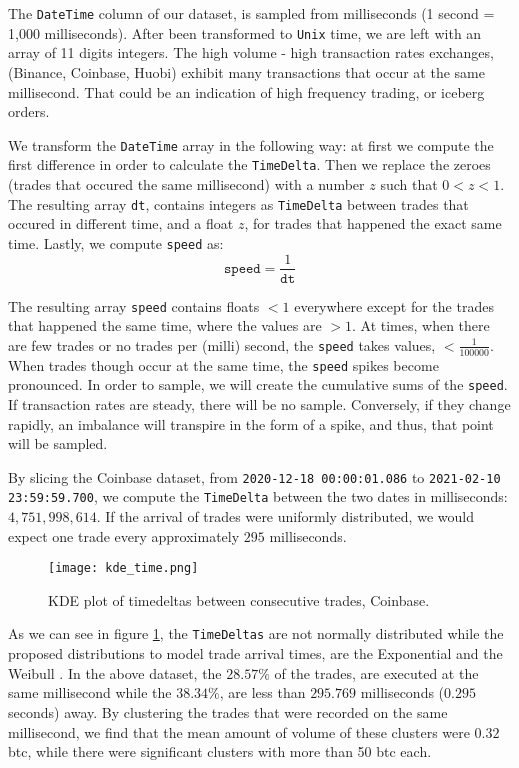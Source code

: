 The \texttt{DateTime} column of our dataset, is sampled from milliseconds (1 second = 1,000 milliseconds). After been transformed to \texttt{Unix} time, we are left with an array of 11 digits integers. The high volume - high transaction rates exchanges, (Binance, Coinbase, Huobi) exhibit many transactions that occur at the same millisecond. That could be an indication of high frequency trading, or iceberg orders. 

We transform the \texttt{DateTime} array in the following way: at first we compute the first difference in order to calculate the \texttt{TimeDelta}. Then we replace the zeroes (trades that occured the same millisecond) with a number \(z\) such that \( 0 < z < 1 \). The resulting array \texttt{dt}, contains integers as \texttt{TimeDelta} between trades that occured in different time, and a float \(z\), for trades that happened the exact same time. Lastly, we compute \texttt{speed} as:
\[ \texttt{speed} = \frac{1}{\texttt{dt}} \] 

The resulting array \texttt{speed} contains floats \( < 1 \) everywhere except for the trades that happened the same time, where the values are \( > 1 \). At times, when there are few trades or no trades per (milli) second, the \texttt{speed} takes values, \( < \frac{1}{100000} \). When trades though occur at the same time, the \texttt{speed} spikes become pronounced. In order to sample, we will create the cumulative sums of the \texttt{speed}. If transaction rates are steady, there will be no sample. Conversely, if they change rapidly, an imbalance will transpire in the form of a spike, and thus, that point will be sampled.

By slicing the Coinbase dataset, from \texttt{2020-12-18 00:00:01.086} to \texttt{2021-02-10 23:59:59.700}, we compute the \texttt{TimeDelta} between the two dates in milliseconds: \( 4,751,998,614 \). If the arrival of trades were uniformly distributed, we would expect one trade every approximately \( 295 \) milliseconds.

\begin{figure}[H]
	\centering
    \texttt{[image: kde\_time.png]}
	\caption{KDE plot of timedeltas between consecutive trades, Coinbase.}
    \label{fig:kde_time}
\end{figure}

As we can see in figure \ref{fig:kde_time}, the \texttt{TimeDeltas} are not normally distributed while the proposed distributions to model trade arrival times, are the Exponential and the Weibull \cite{weib}. In the above dataset, the \(28.57\%\) of the trades, are executed at the same millisecond while the \(38.34\%\), are less than \(295.769\) milliseconds (\(0.295\) seconds) away. By clustering the trades that were recorded on the same millisecond, we find that the mean amount of volume of these clusters were \( 0.32 \) btc, while there were significant clusters with more than 50 btc each.

